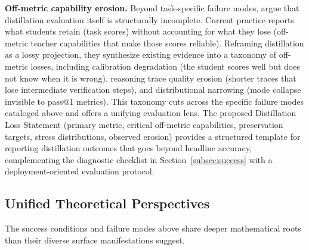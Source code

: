 \documentclass{article} %
\begin{document}
\textbf{Off-metric capability erosion.} Beyond task-specific failure modes, \citet{wang2026kdmust} argue that distillation evaluation itself is structurally incomplete. Current practice reports what students retain (task scores) without accounting for what they lose (off-metric teacher capabilities that make those scores reliable). Reframing distillation as a lossy projection, they synthesize existing evidence into a taxonomy of off-metric losses, including calibration degradation (the student scores well but does not know when it is wrong), reasoning trace quality erosion (shorter traces that lose intermediate verification steps), and distributional narrowing (mode collapse invisible to pass@1 metrics). This taxonomy cuts across the specific failure modes cataloged above and offers a unifying evaluation lens. The proposed Distillation Loss Statement (primary metric, critical off-metric capabilities, preservation targets, stress distributions, observed erosion) provides a structured template for reporting distillation outcomes that goes beyond headline accuracy, complementing the diagnostic checklist in Section~\ref{subsec:success} with a deployment-oriented evaluation protocol.

\subsection{Unified Theoretical Perspectives}
\label{subsec:theory}

The success conditions and failure modes above share deeper mathematical roots than their diverse surface manifestations suggest.
\end{document}
